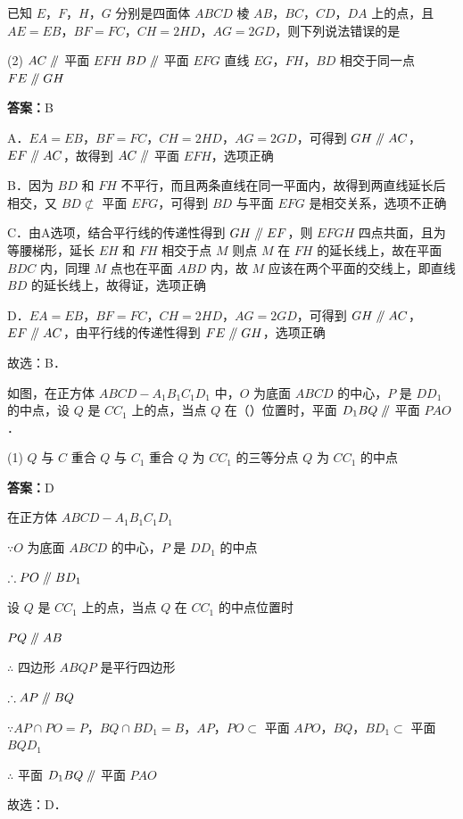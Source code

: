 \begin{example}[\bkstar{3}{5}]
已知 $E$，$F$，$H$，$G$ 分别是四面体 $ABCD$ 棱 $AB$，$BC$，$CD$，$DA$ 上的点，且 $AE=EB$，$BF=FC$，$CH=2HD$，$AG=2GD$，则下列说法错误的是
\begin{tasks}(2)
    \task $AC\mathrel{/\mkern-5mu/}$ 平面 $EFH$
    \task $BD\mathrel{/\mkern-5mu/}$ 平面 $EFG$
    \task 直线 $EG$，$FH$，$BD$ 相交于同一点
    \task $FE\mathrel{/\mkern-5mu/} GH$
\end{tasks}
\end{example}
\begin{solution}
\textbf{答案：}B

A．$EA=EB$，$BF=FC$，$CH=2HD$，$AG=2GD$，可得到 $GH\mathrel{/\mkern-5mu/} AC$，$EF\mathrel{/\mkern-5mu/} AC$，故得到 $AC\mathrel{/\mkern-5mu/}$ 平面 $EFH$，选项正确

B．因为 $BD$ 和 $FH$ 不平行，而且两条直线在同一平面内，故得到两直线延长后相交，又 $BD\not\subset$ 平面 $EFG$，可得到 $BD$ 与平面 $EFG$ 是相交关系，选项不正确

C．由A选项，结合平行线的传递性得到 $GH\mathrel{/\mkern-5mu/} EF$，则 $EFGH$ 四点共面，且为等腰梯形，延长 $EH$ 和 $FH$ 相交于点 $M$ 则点 $M$ 在 $FH$ 的延长线上，故在平面 $BDC$ 内，同理 $M$ 点也在平面 $ABD$ 内，故 $M$ 应该在两个平面的交线上，即直线 $BD$ 的延长线上，故得证，选项正确

D．$EA=EB$，$BF=FC$，$CH=2HD$，$AG=2GD$，可得到 $GH\mathrel{/\mkern-5mu/} AC$，$EF\mathrel{/\mkern-5mu/} AC$，由平行线的传递性得到 $FE\mathrel{/\mkern-5mu/} GH$，选项正确

故选：B．
\end{solution}

\vspace{2em}

\begin{example}[\bkstar{3}{5}]
如图，在正方体 $ABCD-A_1B_1C_1D_1$ 中，$O$ 为底面 $ABCD$ 的中心，$P$ 是 $DD_1$ 的中点，设 $Q$ 是 $CC_1$ 上的点，当点 $Q$ 在（\quad）位置时，平面 $D_1BQ\mathrel{/\mkern-5mu/}$ 平面 $PAO$．
\begin{tasks}(1)
    \task $Q$ 与 $C$ 重合
    \task $Q$ 与 $C_1$ 重合
    \task $Q$ 为 $CC_1$ 的三等分点
    \task $Q$ 为 $CC_1$ 的中点
\end{tasks}
\end{example}
\begin{solution}
\textbf{答案：}D

在正方体 $ABCD-A_1B_1C_1D_1$

$\because O$ 为底面 $ABCD$ 的中心，$P$ 是 $DD_1$ 的中点

$\therefore PO\mathrel{/\mkern-5mu/} BD_1$

设 $Q$ 是 $CC_1$ 上的点，当点 $Q$ 在 $CC_1$ 的中点位置时

$PQ\mathrel{/\mkern-5mu/} AB$

$\therefore$ 四边形 $ABQP$ 是平行四边形

$\therefore AP\mathrel{/\mkern-5mu/} BQ$

$\because AP\cap PO=P$，$BQ\cap BD_1=B$，$AP$，$PO\subset$ 平面 $APO$，$BQ$，$BD_1\subset$ 平面 $BQD_1$

$\therefore$ 平面 $D_1BQ\mathrel{/\mkern-5mu/}$ 平面 $PAO$

故选：D．
\end{solution}

\vspace{2em}
